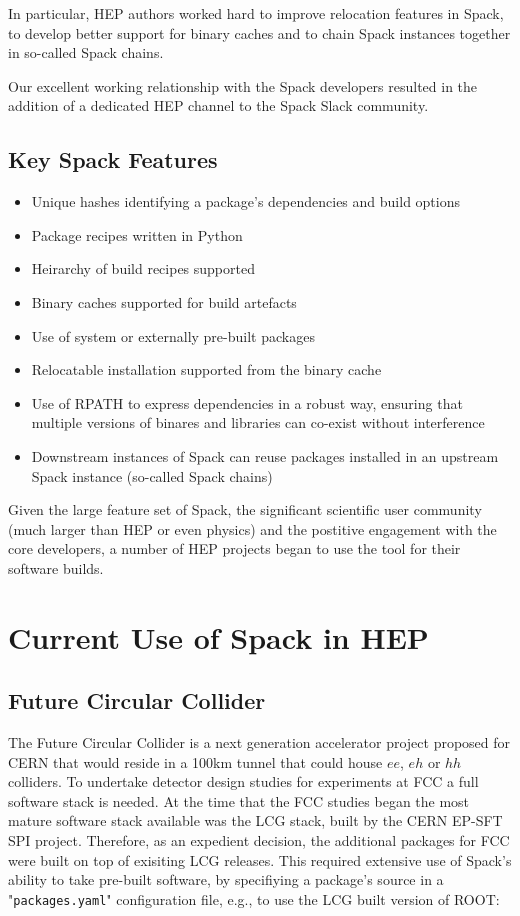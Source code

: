 \documentclass{webofc}
\begin{document}
In particular, HEP authors worked hard to improve relocation features
in Spack, to develop better support for binary caches and to chain Spack
instances together in so-called Spack chains.

Our excellent working relationship with the Spack developers resulted
in the addition of a dedicated HEP channel to the Spack Slack community.

\subsection{Key Spack Features}
\label{spack-features}

\begin{itemize}
    \item Unique hashes identifying a package's dependencies and build options
    \item Package recipes written in Python
    \item Heirarchy of build recipes supported
    \item Binary caches supported for build artefacts
    \item Use of system or externally pre-built packages
    \item Relocatable installation supported from the binary cache
    \item Use of RPATH to express dependencies in a robust way, ensuring that
        multiple versions of binares and libraries can co-exist without
        interference
    \item Downstream instances of Spack can reuse packages
        installed in an upstream Spack instance (so-called Spack chains)
\end{itemize}

Given the large feature set of Spack, the significant scientific user community
(much larger than HEP or even physics) and the postitive engagement with the
core developers, a number of HEP projects began to use the tool for their
software builds.

\section{Current Use of Spack in HEP}
\label{hep-spack-use}

\subsection{Future Circular Collider}
\label{fcc}

The Future Circular Collider\cite{Benedikt:2653673} is a next generation
accelerator project proposed for CERN that would reside in a 100km tunnel that
could house $ee$, $eh$ or $hh$ colliders. To undertake detector design studies
for experiments at FCC a full software stack is needed. At the time that the FCC
studies began the most mature software stack available was the LCG stack, built
by the CERN EP-SFT SPI project\cite{LCGStack}. Therefore, as an expedient
decision, the additional packages for FCC were built on top of exisiting
LCG releases. This required extensive use of Spack's ability to take pre-built
software, by specifiying a package's source in a "\texttt{packages.yaml}" configuration file, e.g., to
use the LCG built version of ROOT:
\end{document}
